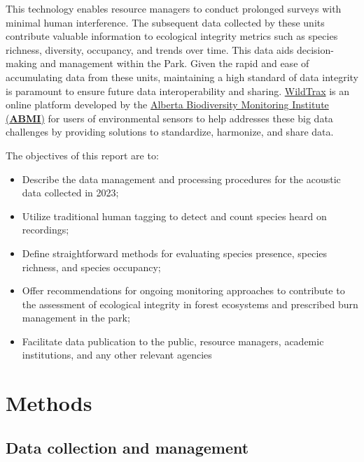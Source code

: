 \documentclass[
  letterpaper,
  DIV=11,
  numbers=noendperiod,
  oneside]{scrartcl}
\providecommand{\tightlist}{%
  \setlength{\itemsep}{0pt}\setlength{\parskip}{0pt}}\usepackage{longtable,booktabs,array}
\begin{document}
This technology enables resource managers to conduct prolonged surveys
with minimal human interference. The subsequent data collected by these
units contribute valuable information to ecological integrity metrics
such as species richness, diversity, occupancy, and trends over time.
This data aids decision-making and management within the Park. Given the
rapid and ease of accumulating data from these units, maintaining a high
standard of data integrity is paramount to ensure future data
interoperability and sharing. \href{https://www.wildtrax.ca}{WildTrax}
is an online platform developed by the \href{https://abmi.ca}{Alberta
Biodiversity Monitoring Institute (\textbf{ABMI})} for users of
environmental sensors to help addresses these big data challenges by
providing solutions to standardize, harmonize, and share data.

The objectives of this report are to:

\begin{itemize}
\tightlist
\item
  Describe the data management and processing procedures for the
  acoustic data collected in 2023;
\item
  Utilize traditional human tagging to detect and count species heard on
  recordings;
\item
  Define straightforward methods for evaluating species presence,
  species richness, and species occupancy;
\item
  Offer recommendations for ongoing monitoring approaches to contribute
  to the assessment of ecological integrity in forest ecosystems and
  prescribed burn management in the park;
\item
  Facilitate data publication to the public, resource managers, academic
  institutions, and any other relevant agencies
\end{itemize}

\hypertarget{methods}{%
\section{Methods}\label{methods}}

\hypertarget{data-collection-and-management}{%
\subsection{Data collection and
management}\label{data-collection-and-management}}
\end{document}
